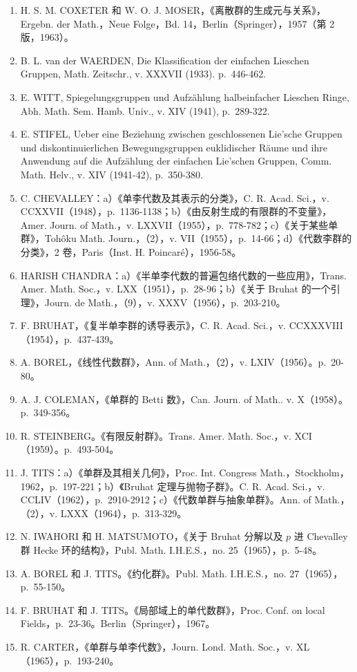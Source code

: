 \begin{enumerate}
\def\labelenumi{(\Roman{enumi})}
\setcounter{enumi}{14}
\item
  H. S. M. COXETER 和 W. O. J. MOSER，《离散群的生成元与关系》，Ergebn. der Math.，Neue Folge，Bd. 14，Berlin（Springer），1957（第 2 版，1963）。
\item
  B. L. van der WAERDEN, Die Klassification der einfachen Lieschen Gruppen, Math. Zeitschr., v. XXXVII (1933). p.~446-462.
\item
  E. WITT, Spiegelungsgruppen und Aufzählung halbeinfacher Lieschen Ringe, Abh. Math. Sem. Hamb. Univ., v. XIV (1941), p.~289-322.
\item
  E. STIFEL, Ueber eine Beziehung zwischen geschlossenen Lie'sche Gruppen und diskontinuierlichen Bewegungsgruppen euklidischer Räume und ihre Anwendung auf die Aufzählung der einfachen Lie'schen Gruppen, Comm. Math. Helv., v. XIV (1941-42), p.~350-380.
\item
  C. CHEVALLEY：a）《单李代数及其表示的分类》，C. R. Acad. Sci.，v. CCXXVII（1948），p.~1136-1138；b）《由反射生成的有限群的不变量》，Amer. Journ. of Math.，v. LXXVII（1955），p.~778-782；c）《关于某些单群》，Tohôku Math. Journ.，（2），v. VII（1955），p.~14-66；d）《代数李群的分类》，2 卷，Paris（Inst. H. Poincaré），1956-58。
\item
  HARISH CHANDRA：a）《半单李代数的普遍包络代数的一些应用》，Trans. Amer. Math. Soc.，v. LXX（1951），p.~28-96；b）《关于 Bruhat 的一个引理》，Journ. de Math.，（9），v. XXXV（1956），p.~203-210。
\item
  F. BRUHAT，《复半单李群的诱导表示》，C. R. Acad. Sci.，v. CCXXXVIII（1954），p.~437-439。
\item
  A. BOREL，《线性代数群》，Ann. of Math.，（2），v. LXIV（1956）。p.~20-80。
\item
  A. J. COLEMAN，《单群的 Betti 数》，Can. Journ. of Math.. v. X（1958）。p.~349-356。
\item
  R. STEINBERG。《有限反射群》。Trans. Amer. Math. Soc.，v. XCI（1959）。p.~493-504。
\item
  J. TITS：a）《单群及其相关几何》，Proc. Int. Congress Math.，Stockholm，1962，p.~197-221；b）《Bruhat 定理与抛物子群》。C. R. Acad. Sci.，v. CCLIV（1962），p.~2910-2912；c）《代数单群与抽象单群》。Ann. of Math.，（2），v. LXXX（1964），p.~313-329。
\item
  N. IWAHORI 和 H. MATSUMOTO，《关于 Bruhat 分解以及 \(p\) 进 Chevalley 群 Hecke 环的结构》，Publ. Math. I.H.E.S.，no. 25（1965），p.~5-48。
\item
  A. BOREL 和 J. TITS。《约化群》。Publ. Math. I.H.E.S.，no. 27（1965），p.~55-150。
\item
  F. BRUHAT 和 J. TITS。《局部域上的单代数群》，Proc. Conf. on local Fields，p.~23-36。Berlin（Springer），1967。
\item
  R. CARTER，《单群与单李代数》，Journ. Lond. Math. Soc.，v. XL（1965），p.~193-240。
\end{enumerate}

